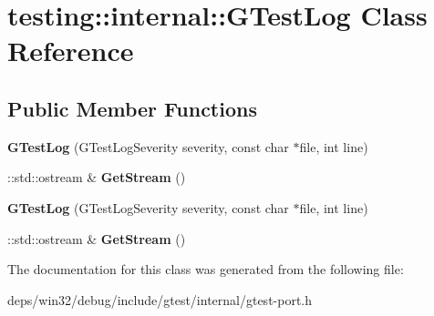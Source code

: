 \hypertarget{classtesting_1_1internal_1_1_g_test_log}{}\section{testing\+:\+:internal\+:\+:G\+Test\+Log Class Reference}
\label{classtesting_1_1internal_1_1_g_test_log}
\subsection*{Public Member Functions}
\begin{DoxyCompactItemize}
\item 
\hypertarget{classtesting_1_1internal_1_1_g_test_log_a364691bf972983a59cfa2891062a64af}{}{\bfseries G\+Test\+Log} (G\+Test\+Log\+Severity severity, const char $\ast$file, int line)\label{classtesting_1_1internal_1_1_g_test_log_a364691bf972983a59cfa2891062a64af}

\item 
\hypertarget{classtesting_1_1internal_1_1_g_test_log_aebb92e67d98eca69f0347d5121dab27a}{}\+::std\+::ostream \& {\bfseries Get\+Stream} ()\label{classtesting_1_1internal_1_1_g_test_log_aebb92e67d98eca69f0347d5121dab27a}

\item 
\hypertarget{classtesting_1_1internal_1_1_g_test_log_a364691bf972983a59cfa2891062a64af}{}{\bfseries G\+Test\+Log} (G\+Test\+Log\+Severity severity, const char $\ast$file, int line)\label{classtesting_1_1internal_1_1_g_test_log_a364691bf972983a59cfa2891062a64af}

\item 
\hypertarget{classtesting_1_1internal_1_1_g_test_log_aebb92e67d98eca69f0347d5121dab27a}{}\+::std\+::ostream \& {\bfseries Get\+Stream} ()\label{classtesting_1_1internal_1_1_g_test_log_aebb92e67d98eca69f0347d5121dab27a}

\end{DoxyCompactItemize}


The documentation for this class was generated from the following file\+:\begin{DoxyCompactItemize}
\item 
deps/win32/debug/include/gtest/internal/gtest-\/port.\+h\end{DoxyCompactItemize}
